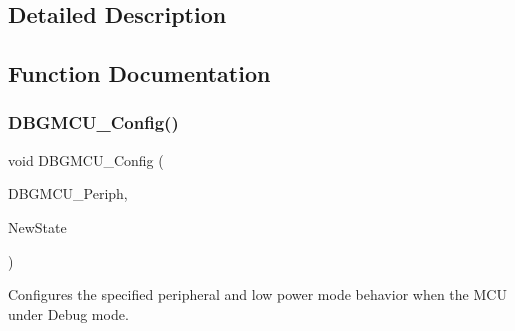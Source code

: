 \subsection{Detailed Description}


\subsection{Function Documentation}
\mbox{\label{group___d_b_g_m_c_u___exported___functions_gadf2f267f855ac1e4c03905c5dcfbd28b}} 
\subsubsection{\texorpdfstring{D\+B\+G\+M\+C\+U\+\_\+\+Config()}{DBGMCU\_Config()}}
{\footnotesize\ttfamily void D\+B\+G\+M\+C\+U\+\_\+\+Config (\begin{DoxyParamCaption}\item[{uint32\+\_\+t}]{D\+B\+G\+M\+C\+U\+\_\+\+Periph,  }\item[{\hyperlink{group___exported__types_gac9a7e9a35d2513ec15c3b537aaa4fba1}{Functional\+State}}]{New\+State }\end{DoxyParamCaption})}



Configures the specified peripheral and low power mode behavior when the M\+CU under Debug mode. 


